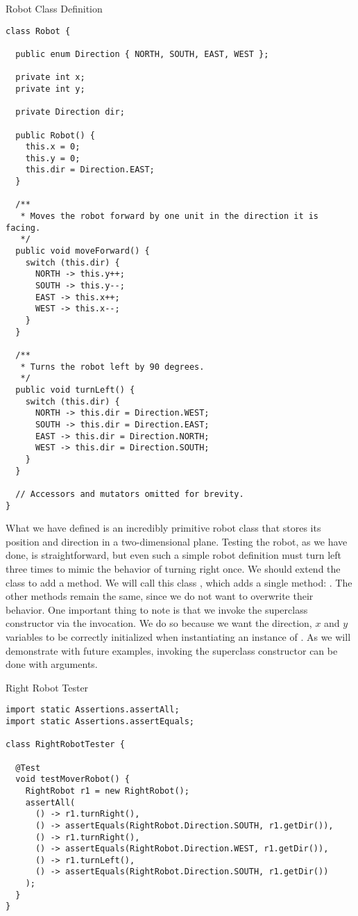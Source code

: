 \begin{cl}{Robot Class Definition}
\begin{lstlisting}[language=MyJava]
class Robot {

  public enum Direction { NORTH, SOUTH, EAST, WEST };

  private int x;
  private int y;

  private Direction dir;

  public Robot() {
    this.x = 0;
    this.y = 0;
    this.dir = Direction.EAST;
  }

  /**
   * Moves the robot forward by one unit in the direction it is facing.
   */
  public void moveForward() {
    switch (this.dir) {
      NORTH -> this.y++;
      SOUTH -> this.y--;
      EAST -> this.x++;
      WEST -> this.x--;
    }
  }

  /**
   * Turns the robot left by 90 degrees.
   */
  public void turnLeft() {
    switch (this.dir) {
      NORTH -> this.dir = Direction.WEST;
      SOUTH -> this.dir = Direction.EAST;
      EAST -> this.dir = Direction.NORTH;
      WEST -> this.dir = Direction.SOUTH;
    }
  }

  // Accessors and mutators omitted for brevity.
}
\end{lstlisting}
\end{cl}
What we have defined is an incredibly primitive robot class that stores its position and direction in a two-dimensional plane. Testing the robot, as we have done, is straightforward, but even such a simple robot definition must turn left three times to mimic the behavior of turning right once. We should extend the  class to add a  method. We will call this class , which adds a single method: . The other methods remain the same, since we do not want to overwrite their behavior. One important thing to note is that we invoke the superclass constructor via the  invocation. We do so because we want the direction, $x$ and $y$ variables to be correctly initialized when instantiating an instance of . As we will demonstrate with future examples, invoking the superclass constructor can be done with arguments.

\begin{cl}{Right Robot Tester}
\begin{lstlisting}[language=MyJava]
import static Assertions.assertAll;
import static Assertions.assertEquals;

class RightRobotTester {

  @Test
  void testMoverRobot() {
    RightRobot r1 = new RightRobot();
    assertAll(
      () -> r1.turnRight(),
      () -> assertEquals(RightRobot.Direction.SOUTH, r1.getDir()),
      () -> r1.turnRight(),
      () -> assertEquals(RightRobot.Direction.WEST, r1.getDir()),
      () -> r1.turnLeft(),
      () -> assertEquals(RightRobot.Direction.SOUTH, r1.getDir())
    );
  }
}
\end{lstlisting}
\end{cl}

